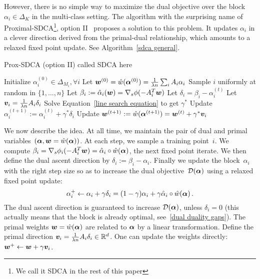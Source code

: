 However, there is no simple way to maximize the dual objective over the block $\alpha_i \in \Delta_K$ in the multi-class setting.
The algorithm with the surprising name of Proximal-SDCA\footnote{We call it SDCA in the rest of this paper}, option II~\citep{shalev2016accelerated} proposes a solution to this problem.
It updates $\alpha_i$  in a clever direction derived from the primal-dual relationship, which amounts to a relaxed fixed point update. See Algorithm~\ref{sdca general}.

\begin{algorithm}[t]
	\caption{Prox-SDCA (option II) called SDCA here}%
	\label{sdca general}
	\begin{algorithmic}
		\STATE Initialize $\alpha_i^{(0)} \in \Delta_{M_i}, \forall i$
		\STATE Let $\boldsymbol{w}^{(0)} = \hat{w}(\bm{\alpha}^{(0)}) = \frac{1}{\lambda n} \sum_i A_i \alpha_i$
		\STATE Sample $i$ uniformly at random in $\{1,\ldots,n\}$
		\STATE Let $ \beta_i := \hat{\alpha}_i(\boldsymbol{w}) = \nabla_s \phi(-A_i^T \boldsymbol{w})$
		\STATE Let $\delta_i = \beta_i - \alpha_i^{(t)}$ 
		\STATE Let $\bm v_i = \frac{1}{\lambda n} A_i \delta_i $ 
		\STATE Solve Equation~\eqref{line search equation} to get $\gamma^*$ 
		\STATE Update $\alpha_i^{(t+1)} := \alpha_i^{(t)} + \gamma^* \delta_i$
		\STATE Update $\boldsymbol{w}^{(t+1)} := \hat{w}(\bm{\alpha}^{(t+1)}) = \boldsymbol{w}^{(t)} + \gamma^* \bm v_i $
		\ENDFOR
	\end{algorithmic}
\end{algorithm}


We now describe the idea.
At all time, we maintain the pair of dual and primal variables~$(\boldsymbol{\alpha}, \boldsymbol{w} = \hat w (\boldsymbol{\alpha}))$.
At each step, we sample a training point~$i$.
We compute $\beta_i = \nabla_s \phi_i(-A_i^T \boldsymbol{w}) = \hat \alpha_i \circ \hat w(\boldsymbol{\alpha})$,  the next fixed point iterate.
We then define the dual ascent direction by $\delta_i := \beta_i - \alpha_i$.
Finally we update the block~$\alpha_i$ with the right step size so as to increase the dual objective~${\mathcal D}(\boldsymbol{\alpha})$ using a relaxed fixed point update:
\begin{equation} \label{eq:dual_fixed_pt_update}
	\alpha_i^+ \leftarrow \alpha_i + \gamma \delta_i = (1-\gamma)\alpha_i + \gamma \hat \alpha_i \circ \hat w(\boldsymbol{\alpha}) \, .
\end{equation}
The dual ascent direction is guaranteed to increase ${\mathcal D}(\boldsymbol{\alpha})$, unless $\delta_i = 0$ (this actually means that the block is already optimal, see~\eqref{dual duality gaps}).
The primal weights $\boldsymbol{w} = \hat w (\boldsymbol{\alpha})$ are related to $\boldsymbol{\alpha}$ by a linear transformation.
Define the primal direction $\bm v_i = \frac{1}{\lambda n} A_i \delta_i \in \mathbb{R}^d$.
One can update the weights directly: $\boldsymbol{w}^+ \leftarrow \boldsymbol{w} + \gamma \bm v_i$.

